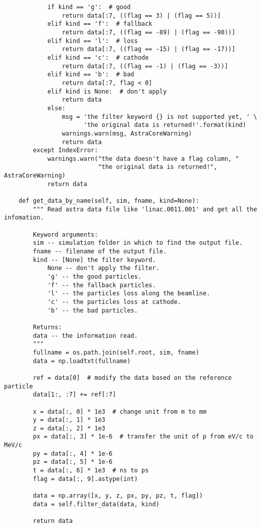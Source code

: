 \begin{footnotesize}
\begin{verbatim}
            if kind == 'g':  # good
                return data[:7, ((flag == 3) | (flag == 5))]
            elif kind == 'f':  # fallback
                return data[:7, ((flag == -89) | (flag == -90))]
            elif kind == 'l':  # loss
                return data[:7, ((flag == -15) | (flag == -17))]
            elif kind == 'c':  # cathode
                return data[:7, ((flag == -1) | (flag == -3))]
            elif kind == 'b':  # bad
                return data[:7, flag < 0]
            elif kind is None:  # don't apply
                return data
            else:
                msg = 'the filter keyword {} is not supported yet, ' \
                      'the original data is returned!'.format(kind)
                warnings.warn(msg, AstraCoreWarning)
                return data
        except IndexError:
            warnings.warn("the data doesn't have a flag column, "
                          "the original data is returned!", AstraCoreWarning)
            return data

    def get_data_by_name(self, sim, fname, kind=None):
        """ Read astra data file like 'linac.0011.001' and get all the infomation.

        Keyword arguments:
        sim -- simulation folder in which to find the output file.
        fname -- filename of the output file.
        kind -- [None] the filter keyword.
            None -- don't apply the filter.
            'g' -- the good particles.
            'f' -- the fallback particles.
            'l' -- the particles loss along the beamline.
            'c' -- the particles loss at cathode.
            'b' -- the bad particles.

        Returns:
        data -- the information read.
        """
        fullname = os.path.join(self.root, sim, fname)
        data = np.loadtxt(fullname)

        ref = data[0]  # modify the data based on the reference particle
        data[1:, :7] += ref[:7]

        x = data[:, 0] * 1e3  # change unit from m to mm
        y = data[:, 1] * 1e3
        z = data[:, 2] * 1e3
        px = data[:, 3] * 1e-6  # transfer the unit of p from eV/c to MeV/c
        py = data[:, 4] * 1e-6
        pz = data[:, 5] * 1e-6
        t = data[:, 6] * 1e3  # ns to ps
        flag = data[:, 9].astype(int)

        data = np.array([x, y, z, px, py, pz, t, flag])
        data = self.filter_data(data, kind)

        return data


\end{verbatim}
\end{footnotesize}
